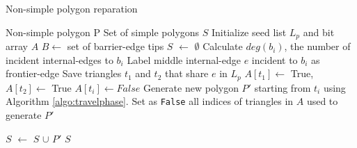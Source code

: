\documentclass[lineno,pdflatex,sn-mathphys]{sn-jnl}%
\theoremstyle{thmstyleone}%
\theoremstyle{thmstyletwo}%
\theoremstyle{thmstylethree}%
\begin{document}
\begin{algorithm}
    \caption{Non-simple polygon reparation}\label{algo:reparationphase}
    \begin{algorithmic}[1]
    \Require Non-simple polygon P
    \Ensure Set of simple polygons $S$
    \State Initialize seed list $L_p$ and bit array $A$ \label{algorepa:inithash}
    \State $B \leftarrow$ set of barrier-edge tips 
    \State $S$ $\leftarrow$ $\emptyset$ 
     \label{algorepa:foreachbet}
        \State Calculate $deg(b_i)$, the number of incident internal-edges  to $b_i$
        \State Label middle internal-edge $e$ incident  to $b_i$ as frontier-edge
        \State Save triangles $t_1$ and $t_2$ that share $e$ in $L_p$
        \State $A[t_1] \leftarrow $ True, $A[t_2] \leftarrow $ True  
    \EndFor
     \label{algorepa:foreachseedtriangle}
         \label{algorepa:true}
            \State $A[t_i] \leftarrow False$
            \State Generate new polygon $P'$ starting from $t_i$  \label{algorepa:generationpoly} using Algorithm \ref{algo:travelphase}. %
        \State Set as \texttt{False} all indices of triangles in $A$ used to generate $P'$ \label{algorepa:removeseeds}
        \EndIf  
        
    \State $S$ $\leftarrow$ $S$ $\cup$ $P'$ 
    \EndFor 
    \State \Return $S$
    \end{algorithmic}
\end{algorithm}
\end{document}
